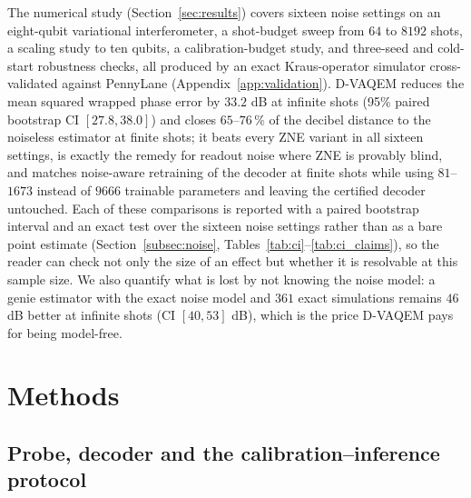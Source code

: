 \documentclass[ASNA,twocolumn]{USG}
\newcommand{\dvaqem}{D-VAQEM}
\begin{document}
The numerical study (Section~\ref{sec:results}) covers sixteen noise settings on
an eight-qubit variational interferometer, a shot-budget sweep from $64$ to
$8192$ shots, a scaling study to ten qubits, a calibration-budget study, and
three-seed and cold-start robustness checks, all produced by an exact
Kraus-operator simulator cross-validated against PennyLane
(Appendix~\ref{app:validation}).  \dvaqem{} reduces the mean squared wrapped
phase error by $33.2$ dB at infinite shots (95\% paired bootstrap CI
$[27.8,38.0]$) and closes $65$--$76\,\%$ of the
decibel distance to the noiseless estimator at finite shots; it beats every
ZNE variant in all sixteen settings, is exactly the remedy for readout noise
where ZNE is provably blind, and matches noise-aware retraining of the decoder
at finite shots while using $81$--$1673$ instead of $9666$ trainable parameters
and leaving the certified decoder untouched.  Each of these comparisons is
reported with a paired bootstrap interval and an exact test over the sixteen
noise settings rather than as a bare point estimate
(Section~\ref{subsec:noise}, Tables~\ref{tab:ci}--\ref{tab:ci_claims}), so the
reader can check not only the size of an effect but whether it is resolvable at
this sample size.  We also quantify what is lost by
not knowing the noise model: a genie estimator with the exact noise model and
$361$ exact simulations remains $46$ dB better at infinite shots (CI
$[40,53]$ dB), which is the
price \dvaqem{} pays for being model-free.

\section{Methods}
\label{sec:methods}

\subsection{Probe, decoder and the calibration--inference protocol}
\label{subsec:protocol}
\end{document}
